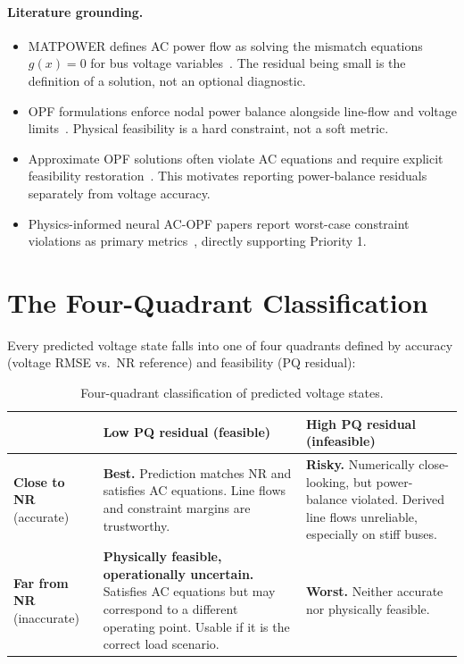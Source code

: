 \documentclass{article}
\begin{document}
\paragraph{Literature grounding.}
\begin{itemize}[noitemsep]
  \item MATPOWER defines AC power flow as solving the mismatch equations
    $g(x)=0$ for bus voltage variables~\cite{matpower}.  The residual being
    small is the definition of a solution, not an optional diagnostic.
  \item OPF formulations enforce nodal power balance alongside line-flow
    and voltage limits~\cite{opfreview}.  Physical feasibility is a hard
    constraint, not a soft metric.
  \item Approximate OPF solutions often violate AC equations and require
    explicit feasibility restoration~\cite{feasrestore}.  This motivates
    reporting power-balance residuals separately from voltage accuracy.
  \item Physics-informed neural AC-OPF papers report worst-case constraint
    violations as primary metrics~\cite{pinnopf}, directly supporting
    Priority 1.
\end{itemize}

\section{The Four-Quadrant Classification}
\label{sec:quadrant}

Every predicted voltage state falls into one of four quadrants defined by
accuracy (voltage RMSE vs.\ NR reference) and feasibility (PQ residual):

\begin{table}[h]
\centering
\caption{Four-quadrant classification of predicted voltage states.}
\label{tab:quadrant}
\begin{tabular}{p{3.5cm} p{4.5cm} p{4.5cm}}
\toprule
 & \textbf{Low PQ residual} (feasible) & \textbf{High PQ residual} (infeasible) \\
\midrule
\textbf{Close to NR} (accurate) &
  \cellcolor{bestgreen}
  \textbf{Best.} Prediction matches NR and satisfies AC equations.
  Line flows and constraint margins are trustworthy. &
  \cellcolor{warnyellow}
  \textbf{Risky.} Numerically close-looking, but power-balance violated.
  Derived line flows unreliable, especially on stiff buses. \\[8pt]
\textbf{Far from NR} (inaccurate) &
  \cellcolor{neutralblue}
  \textbf{Physically feasible, operationally uncertain.}
  Satisfies AC equations but may correspond to a different operating point.
  Usable if it is the correct load scenario. &
  \cellcolor{badred}
  \textbf{Worst.} Neither accurate nor physically feasible. \\
\bottomrule
\end{tabular}
\end{table}
\end{document}
